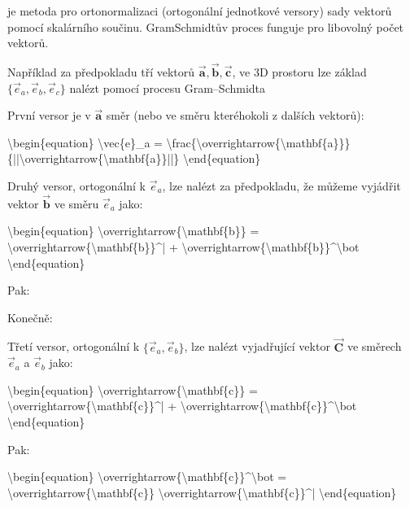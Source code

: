 \documentclass[letterpaper,10pt,english]{jupyterBook}
\begin{document}
\sphinxAtStartPar
{} je metoda pro ortonormalizaci (ortogonální jednotkové versory) sady vektorů pomocí skalárního součinu. Gram\sphinxhyphen{}Schmidtův proces funguje pro libovolný počet vektorů.

\sphinxAtStartPar
Například za předpokladu tří vektorů 
\(\overrightarrow{\mathbf{a}}, \overrightarrow{\mathbf{b}}, \overrightarrow{\mathbf{c}}\), ve 3D prostoru lze základ \(\{\vec{e}_a, \vec{e}_b, \vec{e}_c\}\) nalézt pomocí procesu Gram–Schmidta

\sphinxAtStartPar
První versor je v 
\(\overrightarrow{\mathbf{a}}\) směr (nebo ve směru kteréhokoli z dalších vektorů):


\textbackslash{}begin\{equation\}
\textbackslash{}vec\{e\}\_a = \textbackslash{}frac\{\textbackslash{}overrightarrow\{\textbackslash{}mathbf\{a\}\}\}\{||\textbackslash{}overrightarrow\{\textbackslash{}mathbf\{a\}\}||\}
\textbackslash{}end\{equation\}


\sphinxAtStartPar
Druhý versor, ortogonální k \(\vec{e}_a\), lze nalézt za předpokladu, že můžeme vyjádřit vektor \(\overrightarrow{\mathbf{b}}\) ve směru \(\vec{e}_a\) jako:


\textbackslash{}begin\{equation\}
\textbackslash{}overrightarrow\{\textbackslash{}mathbf\{b\}\} = \textbackslash{}overrightarrow\{\textbackslash{}mathbf\{b\}\}\textasciicircum{}| + \textbackslash{}overrightarrow\{\textbackslash{}mathbf\{b\}\}\textasciicircum{}\textbackslash{}bot
\textbackslash{}end\{equation\}


\sphinxAtStartPar
Pak:



\sphinxAtStartPar
Konečně:



\sphinxAtStartPar
Třetí versor, ortogonální k \(\{\vec{e}_a, \vec{e}_b\}\), lze nalézt vyjadřující vektor \(\overrightarrow{\mathbf{C}}\) ve směrech \(\vec{e}_a\) a \(\vec{e}_b\) jako:


\textbackslash{}begin\{equation\}
\textbackslash{}overrightarrow\{\textbackslash{}mathbf\{c\}\} = \textbackslash{}overrightarrow\{\textbackslash{}mathbf\{c\}\}\textasciicircum{}| + \textbackslash{}overrightarrow\{\textbackslash{}mathbf\{c\}\}\textasciicircum{}\textbackslash{}bot
\textbackslash{}end\{equation\}


\sphinxAtStartPar
Pak:

\textbackslash{}begin\{equation\}
\textbackslash{}overrightarrow\{\textbackslash{}mathbf\{c\}\}\textasciicircum{}\textbackslash{}bot = \textbackslash{}overrightarrow\{\textbackslash{}mathbf\{c\}\} \sphinxhyphen{} \textbackslash{}overrightarrow\{\textbackslash{}mathbf\{c\}\}\textasciicircum{}|
\textbackslash{}end\{equation\}
\end{document}
